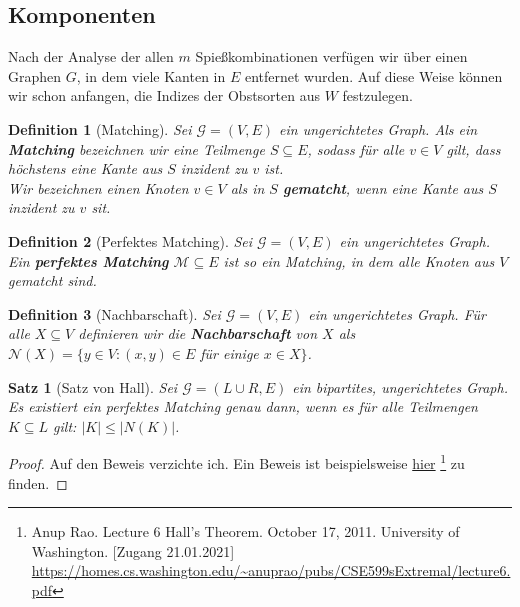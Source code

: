 \documentclass[a4paper,10pt,ngerman]{scrartcl}
\newtheorem{definition}{Definition}
\newtheorem{satz}{Satz}
\begin{document}
\subsection{Komponenten}
Nach der Analyse der allen $m$ Spießkombinationen verfügen wir über einen Graphen $G$,
in dem viele Kanten in $E$ entfernet wurden.
Auf diese Weise können wir schon anfangen, die Indizes der Obstsorten aus $W$ festzulegen.

\begin{definition}[Matching]\label{def:matching}
Sei $\mathcal{G} = (V, E)$ ein ungerichtetes Graph. Als ein \textbf{Matching} bezeichnen wir eine
Teilmenge $S \subseteq E$, sodass für alle $v \in V$ gilt, dass höchstens eine Kante 
aus $S$ inzident zu $v$ ist.\\
Wir bezeichnen einen Knoten $v \in V$ als in $S$ \textbf{gematcht}, wenn eine Kante aus $S$ inzident
zu $v$ sit.
\end{definition}

\begin{definition}[Perfektes Matching]\label{def:perfect-matching}
Sei $\mathcal{G} = (V, E)$ ein ungerichtetes Graph. Ein \textbf{perfektes Matching} $\mathcal{M} \subseteq E$
ist so ein Matching, in dem alle Knoten aus $V$ gematcht sind.
\end{definition}

\begin{definition}[Nachbarschaft]\label{def:nachbarschaft}
Sei $\mathcal{G} = (V, E)$ ein ungerichtetes Graph. Für alle $X \subseteq V$ definieren wir die 
\textbf{Nachbarschaft} von $X$ als $\mathcal{N}(X) = \{y \in V: (x, y) \in E$ für einige $x \in X\}$.
\end{definition}

\begin{satz}[Satz von Hall]
Sei $\mathcal{G} = (L \cup R, E)$ ein bipartites, ungerichtetes Graph. Es existiert ein perfektes Matching genau dann, wenn es für alle Teilmengen $K \subseteq L$ gilt: $|K| \leqslant |N(K)|$.
\end{satz}

\begin{proof}
Auf den Beweis verzichte ich. Ein Beweis ist beispielsweise
\href{https://homes.cs.washington.edu/~anuprao/pubs/CSE599sExtremal/lecture6.pdf}{hier}
\footnote{Anup Rao. Lecture 6 Hall’s Theorem. October 17, 2011. University of Washington. [Zugang 21.01.2021]\\
\url{https://homes.cs.washington.edu/~anuprao/pubs/CSE599sExtremal/lecture6.pdf}} zu finden.
\end{proof}
\end{document}
